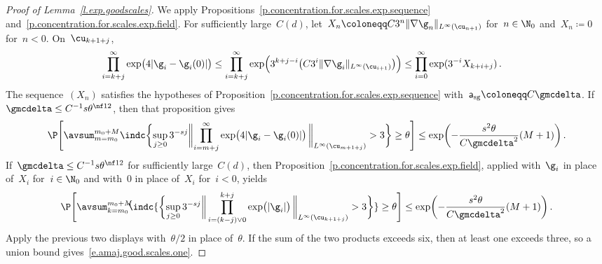 \documentclass[11pt]{amsart}
\begin{document}
\begin{proof}[Proof of Lemma~\ref{l.exp.goodscales}]
We apply Propositions~\ref{p.concentration.for.scales.exp.sequence} and~\ref{p.concentration.for.scales.exp.field}. For sufficiently large~$C(d)$, let~$X_n\coloneqq C3^n\|\nabla\g_n\|_{L^\infty(\cu_{n+1})}$ for~$n\in\N_0$ and~$X_n\coloneqq0$ for~$n<0$. On~$\cu_{k+1+j}$,
\begin{align*}
	\prod_{i=k+j}^{\infty} \exp\bigl(4 | \g_i - \g_i(0) | \bigr)
	&
	\leq
	\prod_{i=k+j}^{\infty} \exp\Bigl( 3^{k+j-i}
	\bigl( C 3^i \| \nabla \g_i \|_{L^\infty(\cu_{i+1})} \bigr)\Bigr)
	\leq
	\prod_{i=0}^{\infty}
	\exp( 3^{-i} X_{k+i+j})
	\,.
\end{align*}
The sequence~$(X_n)$ satisfies the hypotheses of Proposition~\ref{p.concentration.for.scales.exp.sequence} with~$\mathsf a_{\mathrm{sg}}\coloneqq C\gmcdelta$. If~$\gmcdelta\leq C^{-1}s\theta^{\nf12}$, then that proposition gives
\begin{equation*}
	\P \Biggl[
	\avsum_{m=m_0}^{m_0+M}
	\indc\biggl\{
	\sup_{j \geq 0}  3^{- s j}
	\biggl\|
	\prod_{i=m+j}^{\infty} \exp\bigl(4 | \g_i - \g_i(0) | \bigr)
	\, \biggr\|_{L^\infty(\cu_{m+1+j})}
	>
	3
	\biggr\}
	\geq
	\theta
	\Biggr]
	\leq
	\exp\biggl( - \frac{s^2\theta}{C \gmcdelta^{2}} (M+1)  \biggr)  \,.
\end{equation*}
If~$\gmcdelta \leq C^{-1}s \theta^{\nf12}$ for sufficiently large~$C(d)$, then Proposition~\ref{p.concentration.for.scales.exp.field}, applied with~$\g_i$ in place of~$X_i$ for~$i\in\N_0$ and with~$0$ in place of~$X_i$ for~$i<0$, yields
\begin{equation*}
	\P \Biggl[ \avsum_{k=m_0}^{m_0+M} \! \! \! \indc{\biggl\{ \sup_{j \geq 0}
	3^{- s j }
	\biggl\| \, \prod_{i=(k-j)\vee0}^{k+j} \exp\bigl(| \g_i |\bigr) \, \biggr\|_{L^\infty(\cu_{k+1+j})}  > 3 \biggr\}} \geq \theta \Biggr]
	\leq
	\exp \biggl( - \frac{s^2 \theta}{C \gmcdelta^2} (M+1) \biggr)
	\,.
\end{equation*}
Apply the previous two displays with~$\theta/2$ in place of~$\theta$. If the sum of the two products exceeds six, then at least one exceeds three, so a union bound gives~\eqref{e.amaj.good.scales.one}.
\end{proof}
\end{document}

